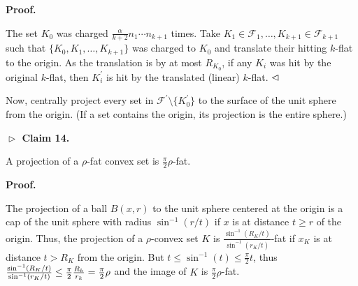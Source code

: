 \par
\par
\par
\par
\par\medskip\noindent\textbf{Proof.}\par
The set $K_{0}$ was charged $\frac{\alpha}{k+2}n_{1}\cdots n_{k+1}$ times. Take $K_{1}\in\mathcal{F}_{1},\ldots,K_{k+1}\in\mathcal{F}_{k+1}$ such that $\{K_{0},K_{1},\ldots,K_{k+1}\}$ was charged to $K_{0}$ and translate their hitting $k$-flat to the origin. As the translation is by at most $R_{K_{0}}$, if any $K_{i}$ was hit by the original $k$-flat, then $K_{i}^{\prime}$ is hit by the translated (linear) $k$-flat. $\hfill\vartriangleleft$
\par
\par
Now, centrally project every set in $\mathcal{F}^{\prime}\setminus\{K_{0}^{\prime}\}$ to the surface of the unit sphere from the origin. (If a set contains the origin, its projection is the entire sphere.)
\par
\par
\par\medskip\noindent\textbf{$\vartriangleright$ Claim 14.}\par
A projection of a $\rho$-fat convex set is $\frac{\pi}{2}\rho$-fat.
\par
\par
\par
\par
\par\medskip\noindent\textbf{Proof.}\par
The projection of a ball $B(x,r)$ to the unit sphere centered at the origin is a cap of the unit sphere with radius $\sin^{-1}(r/t)$ if $x$ is at distance $t\geq r$ of the origin. Thus, the projection of a $\rho$-convex set $K$ is $\frac{\sin^{-1}(R_{K}/t)}{\sin^{-1}(r_{K}/t)}$-fat if $x_{K}$ is at distance $t>R_{K}$ from the origin. But $t\leq\sin^{-1}(t)\leq\frac{\pi}{2}t$, thus $\frac{\sin^{-1}(R_{K}/t)}{\sin^{-1}(r_{K}/t)}\leq\frac{\pi}{2}\frac{R_{k}}{r_{%
k}}=\frac{\pi}{2}\rho$ and the image of $K$ is $\frac{\pi}{2}\rho$-fat.
\par
\par
